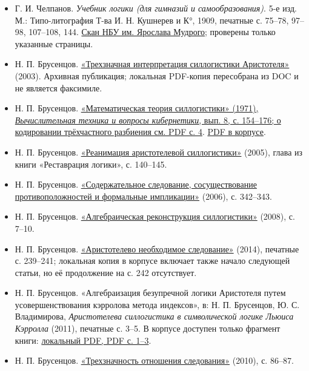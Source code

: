 \documentclass[12pt,a4paper]{article}
\begin{document}
\begin{itemize}
\item Г. И. Челпанов. \emph{Учебник логики (для гимназий и самообразования)}. 5-е изд. М.: Типо-литография Т-ва И. Н. Кушнерев и К°, 1909, печатные с. 75–78, 97–98, 107–108, 144. \href{https://web.nlu.org.ua/view.html?id=238}{Скан НБУ им. Ярослава Мудрого}; проверены только указанные страницы.
\item Н. П. Брусенцов. \href{https://computer-museum.ru/histussr/trilog0.htm}{«Трехзначная интерпретация силлогистики Аристотеля»} (2003). Архивная публикация; локальная PDF-копия пересобрана из DOC и не является факсимиле.
\item Н. П. Брусенцов. \href{https://www.computer-museum.ru/books/setun/brusencov_03.pdf}{«Математическая теория силлогистики» (1971), \emph{Вычислительная техника и вопросы кибернетики}, вып. 8, с. 154–176; о кодировании трёхчастного разбиения см. PDF с. 4}. \href{../sources/pdfs/Брусенцов_Математическая-теория-силлогистики_1971.pdf}{PDF в корпусе}.
\item Н. П. Брусенцов. \href{https://ternarycomp.cs.msu.ru/Papers/Rea.pdf}{«Реанимация аристотелевой силлогистики»} (2005), глава из книги «Реставрация логики», с. 140–145.
\item Н. П. Брусенцов. \href{https://ternarycomp.cs.msu.ru/Papers/Soder_sled.pdf}{«Содержательное следование, сосуществование противоположностей и формальные импликации»} (2006), с. 342–343.
\item Н. П. Брусенцов. \href{https://ternarycomp.cs.msu.ru/Papers/Alrek.pdf}{«Алгебраическая реконструкция силлогистики»} (2008), с. 7–10.
\item Н. П. Брусенцов. \href{https://ternarycomp.cs.msu.ru/Papers/Brusen_IMI14_Neobh_sled.pdf}{«Аристотелево необходимое следование»} (2014), печатные с. 239–241; локальная копия в корпусе включает также начало следующей статьи, но её продолжение на с. 242 отсутствует.
\item Н. П. Брусенцов. «Алгебраизация безупречной логики Аристотеля путем усовершенствования кэрролова метода индексов», в: Н. П. Брусенцов, Ю. С. Владимирова, \emph{Аристотелева силлогистика в символической логике Льюиса Кэрролла} (2011), печатные с. 3–5. В корпусе доступен только фрагмент книги: \href{../sources/pdfs/Брусенцов_Владимирова_Алгебраизация-силлогистики-методом-Кэрролла_2011.pdf}{локальный PDF, PDF с. 1–3}.
\item Н. П. Брусенцов. \href{https://ternarycomp.cs.msu.ru/Papers/brusentsov_sborn2010_1.pdf}{«Трехзначность отношения следования»} (2010), с. 86–87.

\end{itemize}
\end{document}
